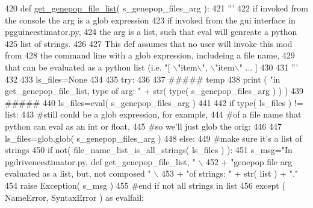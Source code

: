 \begin{DoxyCode}
420 \textcolor{keyword}{def }\hyperlink{namespacenegui_1_1pgdriveneestimator_a15b09d2967ec4812353b0e146f074799}{get\_genepop\_file\_list}( s\_genepop\_files\_arg ):
421     \textcolor{stringliteral}{'''}
422 \textcolor{stringliteral}{    if invoked from the console the arg is a glob expression}
423 \textcolor{stringliteral}{    if invoked from the gui interface in pgguineestimator.py,}
424 \textcolor{stringliteral}{    the arg is a list, such that eval will genreate a python}
425 \textcolor{stringliteral}{    list of strings.}
426 \textcolor{stringliteral}{}
427 \textcolor{stringliteral}{    This def assumes that no user will invoke this mod from }
428 \textcolor{stringliteral}{    the command line with a glob expression, includeing a file name,}
429 \textcolor{stringliteral}{    that can be evaluated as a python list (i.e. "[ \(\backslash\)"item\(\backslash\)", \(\backslash\)"item\(\backslash\)" ... ]}
430 \textcolor{stringliteral}{    }
431 \textcolor{stringliteral}{    '''}
432 
433     ls\_files=\textcolor{keywordtype}{None}
434 
435     \textcolor{keywordflow}{try}:
436 
437         \textcolor{comment}{##### temp}
438         \textcolor{keywordflow}{print} ( \textcolor{stringliteral}{"in get\_genepop\_file\_list, type of arg: "} + str( type( s\_genepop\_files\_arg ) )  )
439         \textcolor{comment}{#####}
440         ls\_files=eval( s\_genepop\_files\_arg )
441 
442         \textcolor{keywordflow}{if} type( ls\_files ) != list:
443             \textcolor{comment}{#still could be a glob expression, for example,}
444             \textcolor{comment}{#of a file name that python can eval as an int or float,}
445             \textcolor{comment}{#so we'll just glob the orig:}
446 
447             ls\_files=glob.glob( s\_genepop\_files\_arg )
448         \textcolor{keywordflow}{else}:
449             \textcolor{comment}{#make sure it's a list of strings}
450             \textcolor{keywordflow}{if} not( file\_name\_list\_is\_all\_strings( ls\_files ) ):
451                 s\_msg=\textcolor{stringliteral}{"In pgdriveneestimator.py, def get\_genepop\_file\_list, "} \(\backslash\)
452                         + \textcolor{stringliteral}{"genepop file arg evaluated as a list, but, not composed "} \(\backslash\)
453                         + \textcolor{stringliteral}{"of strings: "} + str( list ) + \textcolor{stringliteral}{"."}
454                 \textcolor{keywordflow}{raise} Exception( s\_msg )
455             \textcolor{comment}{#end if not all strings in list}
456     \textcolor{keywordflow}{except} ( NameError, SyntaxError ) \textcolor{keyword}{as} evalfail:

\end{DoxyCode}
